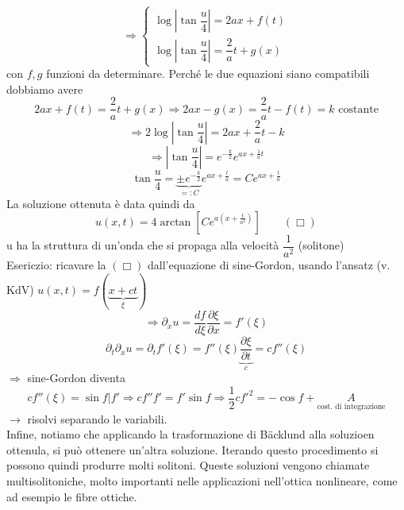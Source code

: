 \documentclass[a4paper,11pt]{report}
\newcommand{\Backlund}{B{\"a}cklund }
\begin{document}
$$
\Rightarrow \left\{ \begin{matrix}
\log \left| \tan \dfrac{u}{4}\right|=2ax + f(t) \\
\log \left| \tan \dfrac{u}{4}\right|= \dfrac{2}{a} t + g(x)
\end{matrix}
\right.
$$
con $f, g$ funzioni da determinare.
Perché le due equazioni siano compatibili dobbiamo avere
$$
2ax + f(t)=\dfrac{2}{a}t + g(x) \Rightarrow 2ax-g(x)=\dfrac{2}{a}t - f(t)=k \text{ costante}
$$
$$
\Rightarrow 2 \log \left| \tan \dfrac{u}{4}\right| = 2ax + \dfrac{2}{a}t - k
$$
$$
\Rightarrow  \left| \tan \dfrac{u}{4}\right| = e^{-\frac{k}{2}}e^{ax + \frac{1}{a}t}
$$
$$
\tan \dfrac{u}{4} = \underset{=:C}{\underbrace{\pm e^{-\frac{k}{2}}}}e^{ax + \frac{t}{a}}=Ce^{ax + \frac{t}{a}}
$$
La soluzione ottenuta è data quindi da
$$
u(x,t)=4\arctan \left[Ce^{a\left(x + \frac{t}{a^2}\right)}\right] \qquad (\Box)
$$
u ha la struttura di un'onda che si propaga alla velocità $\dfrac{1}{a^2}$ (solitone)\\
Esericzio: ricavare la $(\Box)$ dall'equazione di sine-Gordon, usando l'ansatz (v. KdV) $u(x,t)=f(\underset{\xi}{\underbrace{x+ct}})$
$$
\Rightarrow \partial_x u = \dfrac{df}{d\xi}\dfrac{\partial \xi}{\partial x}=f'(\xi)
$$
$$
\partial_t\partial_xu=\partial_tf'(\xi)=f''(\xi)\underset{c}{\underbrace{\dfrac{\partial \xi}{\partial t}}} = cf''(\xi)
$$
$\Rightarrow$ sine-Gordon diventa
$$
cf''(\xi)=\sin f | f' \Rightarrow cf''f'=f'\sin f \Rightarrow \dfrac{1}{2}cf'^2 = -\cos f + \underset{\text{cost. di integrazione}}{A}
$$
$\rightarrow$ risolvi separando le variabili.\\
Infine, notiamo che applicando la trasformazione di \Backlund alla soluzioen ottenula, si può ottenere un'altra soluzione. Iterando questo procedimento si possono quindi produrre molti solitoni. Queste soluzioni vengono chiamate multisolitoniche, molto importanti nelle applicazioni nell'ottica nonlineare, come ad esempio le fibre ottiche.
\end{document}
